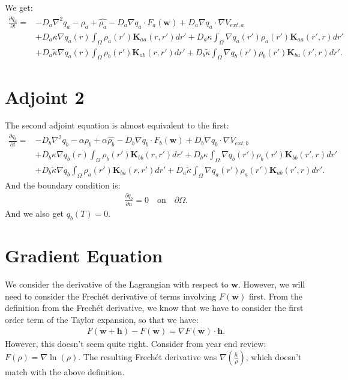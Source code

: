 \documentclass[11pt, a4paper]{article}
\theoremstyle{definition}
\newcommand{\adja}{q_a}
\newcommand{\adjb}{q_b}
\newcommand{\ra}{\rho_a}
\newcommand{\rb}{\rho_b}
\newcommand{\w}{\mathbf{w}}
\newcommand{\h}{\mathbf{h}}
\newcommand{\K}{\mathbf{K}}
\begin{document}
	We get:
	\begin{align*}
	 \frac{\partial \adja}{\partial t} = &- D_a\nabla^2\adja - \ra + \widehat{\ra}    - D_a\nabla \adja \cdot F_a(\w) + D_a \nabla \adja \cdot  \nabla V_{ext,a} \\
	 &+ D_a\kappa \nabla \adja(r) \int_\Omega \ra (r') \K_{aa}(r,r')dr' + D_a\kappa \int_\Omega \nabla \adja(r') \ra (r') \K_{aa}(r',r)dr' \\
	 & + D_a \tilde{\kappa} \nabla \adja(r) \int_\Omega  \rb (r') \K_{ab} (r,r')dr' + D_b \tilde \kappa\int_\Omega \nabla \adjb(r') \rb (r') \K_{ba}(r',r)dr' .
	\end{align*}
	\section{Adjoint 2}
	The second adjoint equation is almost equivalent to the first:
	\begin{align*}
	\frac{\partial \adjb}{\partial t} = &- D_b\nabla^2\adjb - \alpha \rb + \alpha \widehat{\rb}    - D_b\nabla \adjb \cdot F_b(\w) + D_b \nabla \adjb \cdot  \nabla V_{ext,b} \\
	&+ D_b\kappa \nabla \adjb(r) \int_\Omega \rb (r') \K_{bb}(r,r')dr' + D_b\kappa \int_\Omega \nabla \adjb(r') \rb (r') \K_{bb}(r',r)dr' \\
	& + D_b \tilde{\kappa} \nabla \adjb \int_\Omega  \ra (r') \K_{ba} (r,r')dr' + D_a \tilde \kappa\int_\Omega \nabla \adja(r') \ra (r') \K_{ab}(r',r)dr'.
	\end{align*}
	And the boundary condition is:
	\begin{align*}
	\frac{\partial \adjb}{\partial n} = 0 \quad \text{on} \quad \partial \Omega.
	\end{align*} 
	And we also get $\adjb(T) = 0$.
	
	\section{Gradient Equation}
	We consider the derivative of the Lagrangian with respect to $\w$. However, we will need to consider the Frech\'et derivative of terms involving $F(\w)$ first.
	From the definition from the Frech\'et derivative, we know that we have to consider the first order term of the Taylor expansion, so that we have:
	\begin{align*}
	F(\w + \h) - F(\w) = \nabla F(\w)\cdot \h.
	\end{align*}
	However, this doesn't seem quite right. Consider from year end review: $F(\rho) = \nabla \ln (\rho)$. The resulting Frech\'et derivative was $\nabla(\frac{h}{\rho})$, which doesn't match with the above definition. 
	

	
\end{document}
